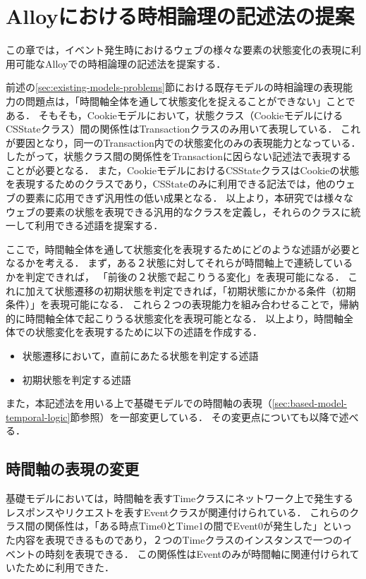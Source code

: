 \documentclass[12pt,a4paper]{jbook}
\begin{document}
\newpage

\chapter{Alloyにおける時相論理の記述法の提案}
\label{sec:ProposedModel-TemporalLogic}
この章では，イベント発生時におけるウェブの様々な要素の状態変化の表現に利用可能なAlloyでの時相論理の記述法を提案する．

前述の\ref{sec:existing-models-problems}節における既存モデルの時相論理の表現能力の問題点は，「時間軸全体を通して状態変化を捉えることができない」ことである．
そもそも，Cookieモデルにおいて，状態クラス（CookieモデルにけるCSStateクラス）間の関係性はTransactionクラスのみ用いて表現している．
これが要因となり，同一のTransaction内での状態変化のみの表現能力となっている．
したがって，状態クラス間の関係性をTransactionに因らない記述法で表現することが必要となる．
また，CookieモデルにおけるCSStateクラスはCookieの状態を表現するためのクラスであり，CSStateのみに利用できる記法では，他のウェブの要素に応用できず汎用性の低い成果となる．
以上より，本研究では様々なウェブの要素の状態を表現できる汎用的なクラスを定義し，それらのクラスに統一して利用できる述語を提案する．

ここで，時間軸全体を通して状態変化を表現するためにどのような述語が必要となるかを考える．
まず，ある２状態に対してそれらが時間軸上で連続しているかを判定できれば，
「前後の２状態で起こりうる変化」を表現可能になる．
これに加えて状態遷移の初期状態を判定できれば，「初期状態にかかる条件（初期条件）」を表現可能になる．
これら２つの表現能力を組み合わせることで，帰納的に時間軸全体で起こりうる状態変化を表現可能となる．
以上より，時間軸全体での状態変化を表現するために以下の述語を作成する．
\begin{itemize}
\item 状態遷移において，直前にあたる状態を判定する述語
\item 初期状態を判定する述語
\end{itemize}

また，本記述法を用いる上で基礎モデルでの時間軸の表現（\ref{sec:based-model-temporal-logic}節参照）を一部変更している．
その変更点についても以降で述べる．

\section{時間軸の表現の変更}
基礎モデル\cite{based-model}においては，時間軸を表すTimeクラスにネットワーク上で発生するレスポンスやリクエストを表すEventクラスが関連付けられている．
これらのクラス間の関係性は，「ある時点Time0とTime1の間でEvent0が発生した」といった内容を表現できるものであり，２つのTimeクラスのインスタンスで一つのイベントの時刻を表現できる．
この関係性はEventのみが時間軸に関連付けられていたために利用できた．
\end{document}
